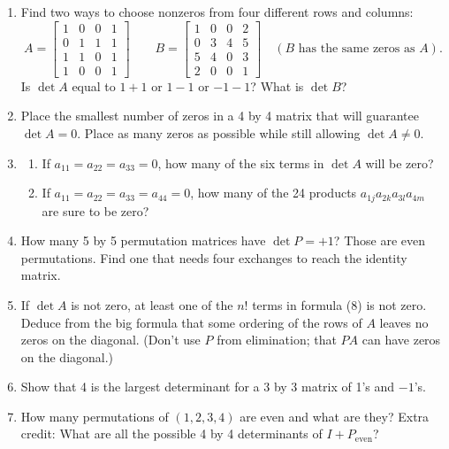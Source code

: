 \documentclass[14pt, a4paper]{article}
\begin{document}
\begin{enumerate}
    \item Find two ways to choose nonzeros from four different rows and columns:
          \[
              A = \begin{bmatrix} 1 & 0 & 0 & 1 \\ 0 & 1 & 1 & 1 \\ 1 & 1 & 0 & 1 \\ 1 & 0 & 0 & 1 \end{bmatrix} \qquad
              B = \begin{bmatrix} 1 & 0 & 0 & 2 \\ 0 & 3 & 4 & 5 \\ 5 & 4 & 0 & 3 \\ 2 & 0 & 0 & 1 \end{bmatrix} \quad
              (B \text{ has the same zeros as } A).
          \]
          Is $\det A$ equal to $1+1$ or $1-1$ or $-1-1$? What is $\det B$?

    \item Place the smallest number of zeros in a 4 by 4 matrix that will guarantee $\det A = 0$. Place as many zeros as possible while still allowing $\det A \neq 0$.

    \item
          \begin{enumerate}
              \item[(a)] If $a_{11} = a_{22} = a_{33} = 0$, how many of the six terms in $\det A$ will be zero?
              \item[(b)] If $a_{11} = a_{22} = a_{33} = a_{44} = 0$, how many of the 24 products $a_{1j}a_{2k}a_{3l}a_{4m}$ are sure to be zero?
          \end{enumerate}

    \item How many 5 by 5 permutation matrices have $\det P = +1$? Those are even permutations. Find one that needs four exchanges to reach the identity matrix.

    \item If $\det A$ is not zero, at least one of the $n!$ terms in formula (8) is not zero. Deduce from the big formula that some ordering of the rows of $A$ leaves no zeros on the diagonal. (Don't use $P$ from elimination; that $PA$ can have zeros on the diagonal.)

    \item Show that 4 is the largest determinant for a 3 by 3 matrix of 1's and $-1$'s.

    \item How many permutations of $(1,2,3,4)$ are even and what are they? Extra credit: What are all the possible 4 by 4 determinants of $I + P_{\text{even}}$?
\end{enumerate}
\end{document}
